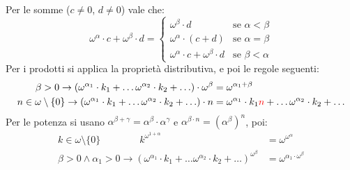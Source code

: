 \begin{proposition}
	Per le somme ($c \ne 0$, $d \ne 0$) vale che:
	\[ \omega^{\alpha} \cdot c + \omega^\beta \cdot d = \begin{cases}
		\omega^\beta \cdot d &\text{se $\alpha < \beta$} \\
		\omega^\alpha \cdot (c + d) &\text{se $\alpha = \beta$} \\
		\omega^{\alpha} \cdot c + \omega^\beta \cdot d &\text{se $\beta < \alpha$}
	\end{cases}
		\]
	Per i prodotti si applica la propriet\`a distributiva, e poi le regole seguenti:
	\begin{align*}
		\beta > 0 \rightarrow (\omega^{\alpha_1} \cdot k_1 + \ldots \omega^{\alpha_2} \cdot k_2 + \ldots) \cdot \omega^{\beta} &= \omega^{\alpha_1 + \beta} \\
		n \in \omega\setminus\{0\} \rightarrow (\omega^{\alpha_1} \cdot k_1 + \ldots \omega^{\alpha_2} \cdot k_2 + \ldots) \cdot n &= \omega^{\alpha_1} \cdot k_1\textcolor{red}{n} + \ldots \omega^{\alpha_2} \cdot k_2 + \ldots
	\end{align*}
	Per le potenza si usano $\alpha^{\beta + \gamma} = \alpha^\beta \cdot \alpha^\gamma$ e $\alpha^{\beta \cdot n} = (\alpha^\beta)^n$, poi:
	\begin{align*}
		k \in \omega\setminus\{0\}\qquad\qquad k^{\omega^{1 + \alpha}} &= \omega^{\omega^{\alpha}} \\
		\beta > 0 \land \alpha_1 > 0 \rightarrow (\omega^{\alpha_1} \cdot k_1 + \ldots \omega^{\alpha_2} \cdot k_2 + \ldots)^{\omega^\beta} &= \omega^{\alpha_1 \cdot \omega^\beta}
	\end{align*}
\end{proposition}

